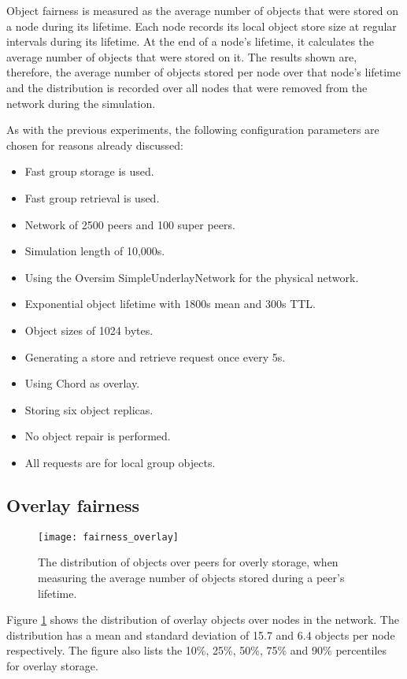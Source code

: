Object fairness is measured as the average number of objects that were stored on a node during its lifetime. Each node records its local object store size at regular intervals during its lifetime. At the end of a node's lifetime, it calculates the average number of objects that were stored on it. The results shown are, therefore, the average number of objects stored per node over that node's lifetime and the distribution is recorded over all nodes that were removed from the network during the simulation.

As with the previous experiments, the following configuration parameters are chosen for reasons already discussed:
%
\begin{itemize}
\item Fast group storage is used.
\item Fast group retrieval is used.
\item Network of 2500 peers and 100 super peers.
\item Simulation length of 10,000s.
\item Using the Oversim SimpleUnderlayNetwork for the physical network.
\item Exponential object lifetime with 1800s mean and 300s TTL.
\item Object sizes of 1024 bytes.
\item Generating a store and retrieve request once every 5s.
\item Using Chord as overlay.
\item Storing six object replicas.
\item No object repair is performed.
\item All requests are for local group objects.
\end{itemize}

\subsection{Overlay fairness}

\begin{figure}[htbp]
 \centering
 \texttt{[image: fairness\_overlay]}
 \caption{The distribution of objects over peers for overly storage, when measuring the average number of objects stored during a peer's lifetime.}
 \label{fig_overlay_fairness}
\end{figure}
%
Figure \ref{fig_overlay_fairness} shows the distribution of overlay objects over nodes in the network. The distribution has a mean and standard deviation of 15.7 and 6.4 objects per node respectively. The figure also lists the 10\%, 25\%, 50\%, 75\% and 90\% percentiles for overlay storage.

